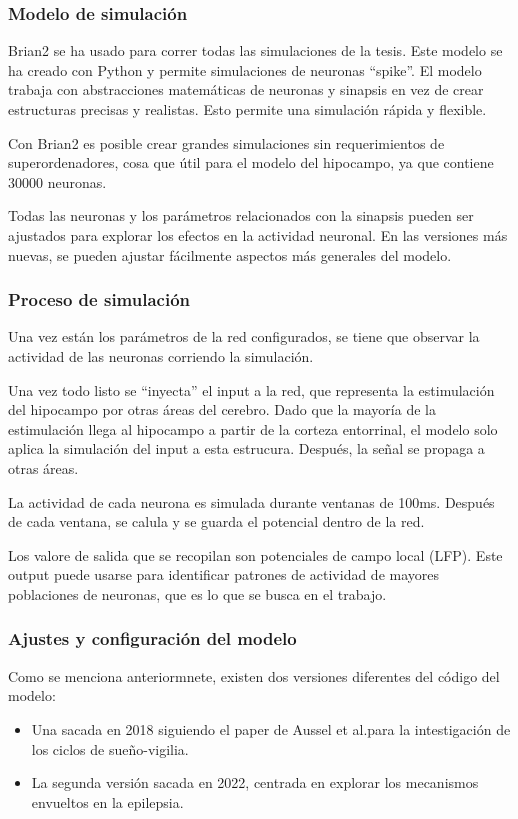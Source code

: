 \documentclass[12pt, letterpaper]{article}
\begin{document}
\subsubsection{Modelo de simulación}
Brian2 se ha usado para correr todas las simulaciones de la tesis. Este modelo se ha creado con Python y permite simulaciones de neuronas ``spike''. El modelo trabaja con abstracciones matemáticas de neuronas y sinapsis en vez de crear estructuras precisas y realistas. Esto permite una simulación rápida y flexible.

Con Brian2 es posible crear grandes simulaciones sin requerimientos de superordenadores, cosa que útil para el modelo del hipocampo, ya que contiene 30000 neuronas. 

Todas las neuronas y los parámetros relacionados con la sinapsis pueden ser ajustados para explorar los efectos en la actividad neuronal. En las versiones más nuevas, se pueden ajustar fácilmente aspectos más generales del modelo.

\subsubsection{Proceso de simulación}
Una vez están los parámetros de la red configurados, se tiene que observar la actividad de las neuronas corriendo la simulación. 

Una vez todo listo se ``inyecta'' el input a la red, que representa la estimulación del hipocampo por otras áreas del cerebro. Dado que la mayoría de la estimulación llega al hipocampo a partir de la corteza entorrinal, el modelo solo aplica la simulación del input a esta estrucura. Después, la señal se propaga a otras áreas.

La actividad de cada neurona es simulada durante ventanas de 100ms. Después de cada ventana, se calula y se guarda el potencial dentro de la red.

Los valore de salida que se recopilan son potenciales de campo local (LFP). Este output puede usarse para identificar patrones de actividad de mayores poblaciones de neuronas, que es lo que se busca en el trabajo.

\subsubsection{Ajustes y configuración del modelo}
Como se menciona anteriormnete, existen dos versiones diferentes del código del modelo:
\begin{itemize}
    \item Una sacada en 2018 siguiendo el paper de Aussel et al.\@ para la intestigación de los ciclos de sueño-vigilia.
    \item La segunda versión sacada en 2022, centrada en explorar los mecanismos envueltos en la epilepsia.
\end{itemize}
\end{document}
